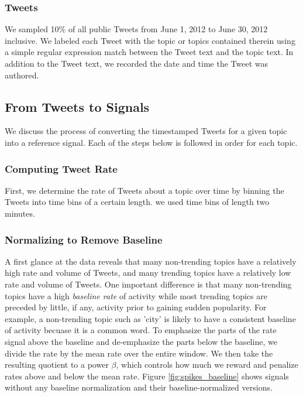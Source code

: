 \subsubsection{Tweets}
We sampled 10\% of all public Tweets from June 1, 2012 to June 30, 2012
inclusive. We labeled each Tweet with the topic or topics contained therein
using a simple regular expression match between the Tweet text and the topic
text. In addition to the Tweet text, we recorded the date and time the Tweet was
authored.

\subsection{From Tweets to Signals}
We discuss the process of converting the timestamped Tweets for a given topic
into a reference signal. Each of the steps below is followed in order for each
topic.

\subsubsection{Computing Tweet Rate}
First, we determine the rate of Tweets about a topic over time by binning the
Tweets into time bins of a certain length. we used time bins of length two
minutes. 

\subsubsection{Normalizing to Remove Baseline}
A first glance at the data reveals that many non-trending topics have a
relatively high rate and volume of Tweets, and many trending topics have a
relatively low rate and volume of Tweets. One important difference is that many
non-trending topics have a high {\em baseline rate} of activity while most
trending topics are preceded by little, if any, activity prior to gaining sudden
popularity. For example, a non-trending topic such as 'city' is likely to have a
consistent baseline of activity becuase it is a common word. To emphasize the
parts of the rate signal above the baseline and de-emphasize the parts below the
baseline, we divide the rate by the mean rate over the entire window. We then
take the resulting quotient to a power $\beta$, which controls how much we
reward and penalize rates above and below the mean rate. Figure
\ref{fig:spikes_baseline} shows signals without any baseline normalization and
their baseline-normalized versions.


